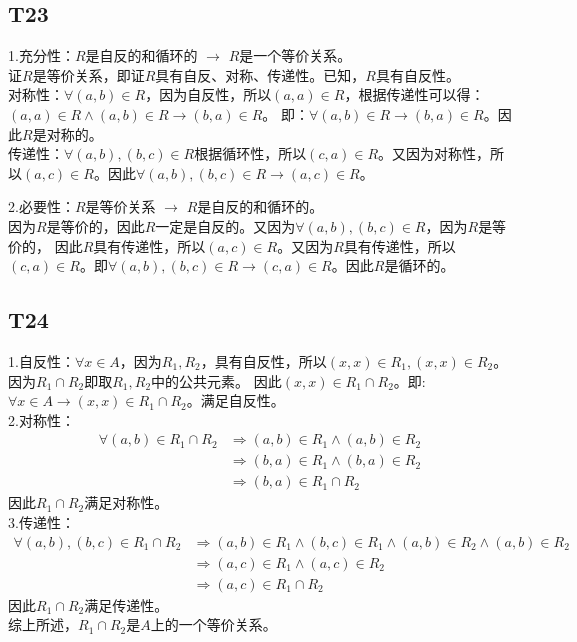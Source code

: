 \documentclass{article}
\begin{document}
\subsection{T23}
1.充分性：$R$是自反的和循环的 $\rightarrow$ $R$是一个等价关系。\\
证$R$是等价关系，即证$R$具有自反、对称、传递性。已知，$R$具有自反性。\\
对称性：$\forall (a, b) \in R$，因为自反性，所以$(a, a) \in R$，根据传递性可以得：$(a, a)\in R \land (a, b) \in R \rightarrow (b, a) \in R$。
即：$\forall (a, b) \in R \rightarrow (b, a) \in R$。因此$R$是对称的。\\
传递性：$\forall (a, b), (b, c) \in R$根据循环性，所以$(c, a) \in R$。又因为对称性，所以$(a, c) \in R$。因此$\forall (a, b), (b, c) \in R
\rightarrow (a, c) \in R$。

2.必要性：$R$是等价关系 $\rightarrow$ $R$是自反的和循环的。 \\
因为$R$是等价的，因此$R$一定是自反的。又因为$\forall (a, b), (b, c) \in R$，因为$R$是等价的，
因此$R$具有传递性，所以$(a, c) \in R$。又因为$R$具有传递性，所以$(c, a) \in R$。即$\forall (a, b), (b, c) \in R
\rightarrow (c, a) \in R$。因此$R$是循环的。
\subsection{T24}
1.自反性：$\forall x \in A$，因为$R_1, R_2$，具有自反性，所以$(x, x) \in R_1, (x, x) \in R_2$。因为$R_1 \cap R_2$即取$R_1, R_2$中的公共元素。
因此$(x, x) \in R_1 \cap R_2$。即:$\forall x \in A \rightarrow (x, x) \in R_1 \cap R_2$。满足自反性。\\
2.对称性：
\begin{align*}
    \forall (a, b) \in R_1 \cap R_2 &\Rightarrow (a, b) \in R_1 \land (a, b) \in R_2\\
    &\Rightarrow (b, a) \in R_1 \land (b, a) \in R_2\\
    &\Rightarrow (b, a) \in R_1 \cap R_2
\end{align*}因此$R_1 \cap R_2$满足对称性。\\
3.传递性：
\begin{align*}
    \forall (a, b), (b, c) \in R_1 \cap R_2 &\Rightarrow (a, b) \in R_1 \land (b, c) \in R_1 \land (a, b) \in R_2 \land (a, b) \in R_2\\
    &\Rightarrow (a, c) \in R_1 \land (a, c) \in R_2\\
    &\Rightarrow (a, c) \in R_1 \cap R_2
\end{align*}因此$R_1 \cap R_2$满足传递性。\\
综上所述，$R_1 \cap R_2$是$A$上的一个等价关系。
\end{document}
